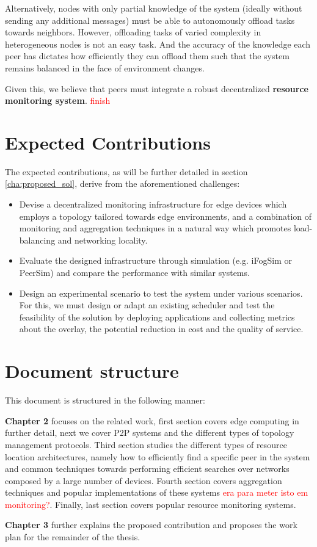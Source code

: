 Alternatively, nodes with only partial knowledge of the system (ideally without sending any additional messages) must be able to autonomously offload tasks towards neighbors. However, offloading tasks of varied complexity in heterogeneous nodes is not an easy task. And the accuracy of the knowledge each peer has dictates how efficiently they can offload them such that the system  remains balanced in the face of environment changes. 

Given this, we believe that peers must integrate a robust decentralized \textbf{resource monitoring system}. \textcolor{red}{finish}

\section{Expected Contributions}

The expected contributions, as will be further detailed in section \ref{cha:proposed_sol}, derive from the aforementioned challenges:

\begin{itemize}

    \item Devise a decentralized monitoring infrastructure for edge devices which employs a topology tailored towards edge environments, and a combination of monitoring and aggregation techniques in a natural way which promotes load-balancing and networking locality.
    
    \item Evaluate the designed infrastructure through simulation (e.g. iFogSim or PeerSim) and compare the performance with similar systems.

    \item Design an experimental scenario to test the system under various scenarios. For this, we must design or adapt an existing scheduler and test the feasibility of the solution by deploying applications and collecting metrics about the overlay, the potential reduction in cost and the quality of service.
    
\end{itemize}

\section{Document structure}

This document is structured in the following manner:

\textbf{Chapter 2} focuses on the related work, first section covers edge computing in further detail, next we cover P2P systems and the different types of topology management protocols. Third section studies the different types of resource location architectures, namely how to efficiently find a specific peer in the system and common techniques towards performing efficient searches over networks composed by a large number of devices. Fourth section covers aggregation techniques and popular implementations of these systems \textcolor{red}{era para meter isto em monitoring?}. Finally, last section covers popular resource monitoring systems.

\textbf{Chapter 3} further explains the proposed contribution and proposes the work plan for the remainder of the thesis. 

